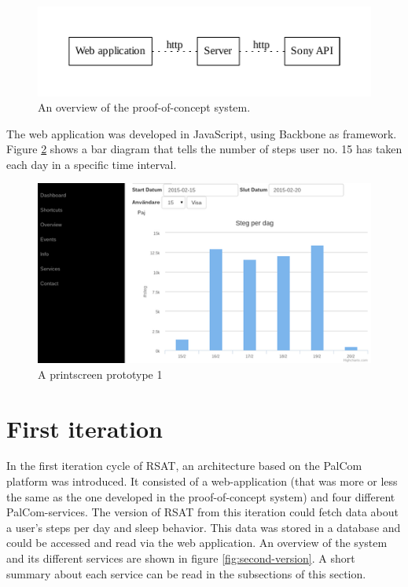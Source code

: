 \documentclass{cslthse-msc}
\begin{document}
\begin{figure}[!hbt]
\centering
\includegraphics[scale=0.8]{firs_verison.pdf} 
\caption{An overview of the proof-of-concept system.}\label{fig:firstV}
\end{figure}

The web application was developed in JavaScript, using Backbone as framework. Figure \ref{fig:firstV_screen} shows a bar diagram that tells the number of steps user no. 15 has taken each day in a specific time interval.

\begin{figure}[!hbt]
\centering
\includegraphics[scale=0.8]{first_prototype_screenshot_crop.png} 
\caption{A printscreen prototype 1}\label{fig:firstV_screen}
\end{figure}


\section{First iteration}
In the first iteration cycle of RSAT, an architecture based on the PalCom platform was introduced.  It consisted of a web-application (that was more or less the same as the one developed in the proof-of-concept system) and four different PalCom-services. The version of RSAT from this iteration could fetch data about a user’s steps per day and sleep behavior. This data was stored in a database and could be accessed and read via the web application. An overview of the system and its different services are shown in figure \ref{fig:second-version}. A short summary about each service can be read in the subsections of this section. 
\end{document}

